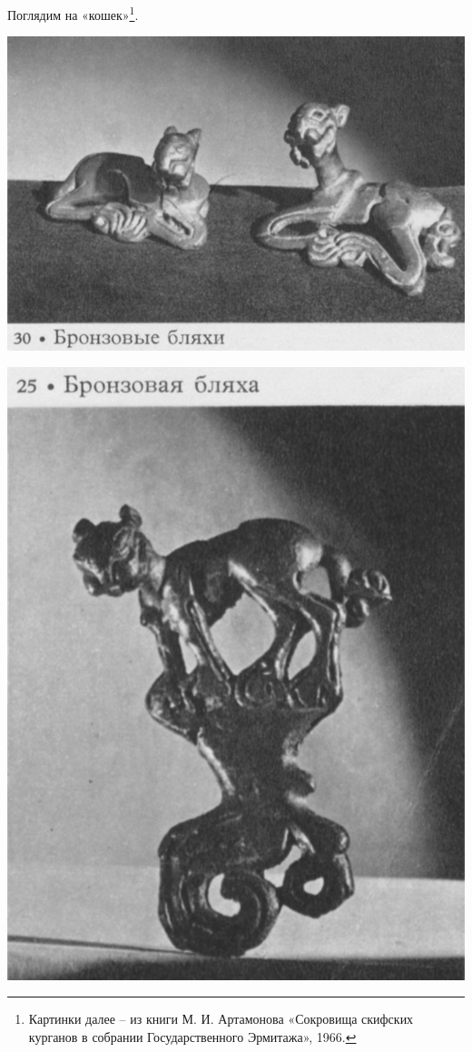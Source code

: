 Поглядим на «кошек»\footnote{Картинки далее – из книги М. И. Артамонова «Сокровища скифских курганов в собрании Государственного Эрмитажа», 1966.}.

\vspace*{\fill}
\begin{center}
\includegraphics[width=\linewidth]{chast-colebanie-osnov/alani/artamonov-mi-1966-030.jpg}
\end{center}
\vspace*{\fill}
\newpage
\vspace*{\fill}
\begin{center}
\includegraphics[width=\linewidth]{chast-colebanie-osnov/alani/artamonov-mi-1966-025.jpg}
\end{center}
\vspace*{\fill}
\newpage

